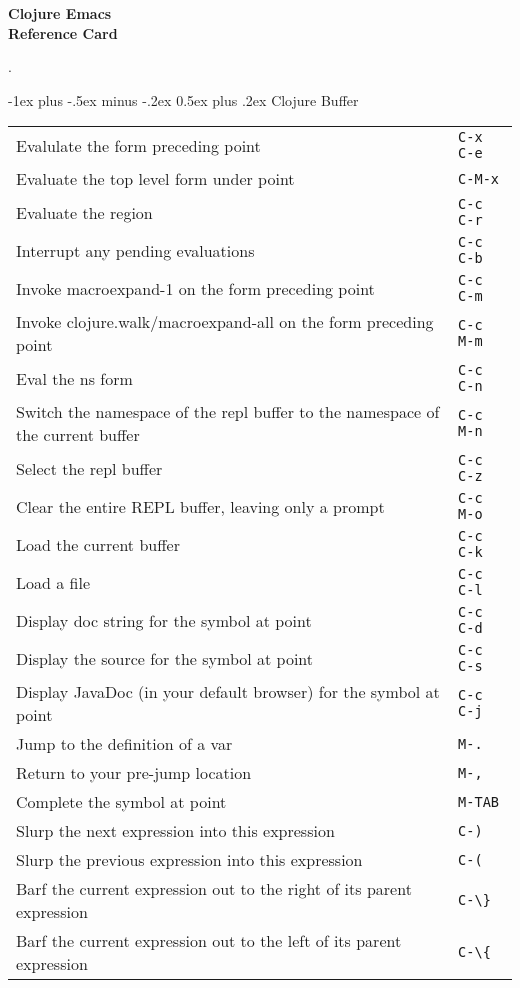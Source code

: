 \documentclass[12pt,landscape]{article}
\makeatletter
\renewcommand{\section}{\@startsection{section}{1}{0mm}%
                                {-1ex plus -.5ex minus -.2ex}%
                                {0.5ex plus .2ex}%
                                {\normalfont\large\bfseries}}
\makeatother
\begin{document}
\raggedright
\footnotesize
\begin{multicols}{3}


\setlength{\premulticols}{1pt}
\setlength{\postmulticols}{1pt}
\setlength{\multicolsep}{1pt}
\setlength{\columnsep}{2pt}

\begin{center}
     \Large{\textbf{Clojure Emacs \\ Reference Card}} \\
\end{center}.

\section{Clojure Buffer}
\begin{tabular}{p{6cm}p{1cm}} %
	Evalulate the form preceding point    & \verb!C-x C-e!  \\
	Evaluate the top level form under point & \verb!C-M-x! \\
	Evaluate the region & \verb!C-c C-r! \\
	Interrupt any pending evaluations & \verb!C-c C-b! \\
	Invoke macroexpand-1 on the form preceding point & \verb!C-c C-m! \\
	Invoke clojure.walk/macroexpand-all on the form preceding point & \verb!C-c M-m! \\
	Eval the ns form & \verb!C-c C-n! \\
	Switch the namespace of the repl buffer to the namespace of the current buffer & \verb!C-c M-n! \\
	Select the repl buffer & \verb!C-c C-z! \\
	Clear the entire REPL buffer, leaving only a prompt & \verb!C-c M-o! \\
	Load the current buffer & \verb!C-c C-k! \\
	Load a file & \verb!C-c C-l! \\
	Display doc string for the symbol at point & \verb!C-c C-d! \\
	Display the source for the symbol at point & \verb!C-c C-s! \\
	Display JavaDoc (in your default browser) for the symbol at point & \verb!C-c C-j! \\
	Jump to the definition of a var & \verb!M-.! \\
	Return to your pre-jump location & \verb!M-,! \\
	Complete the symbol at point & \verb!M-TAB! \\
	Slurp the next expression into this expression & \verb!C-)! \\
	Slurp the previous expression into this expression & \verb!C-(! \\
	Barf the current expression out to the right of its parent expression & \verb!C-\}! \\
	Barf the current expression out to the left of its parent expression & \verb!C-\{! \\
	

\end{tabular}
\end{multicols}
\end{document}
